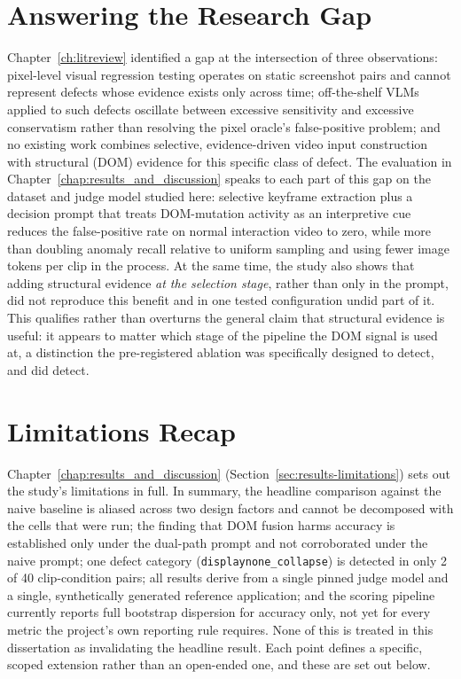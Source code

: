 \section{Answering the Research Gap}
Chapter~\ref{ch:litreview} identified a gap at the intersection of three observations: pixel-level visual regression testing operates on static screenshot pairs and cannot represent defects whose evidence exists only across time; off-the-shelf VLMs applied to such defects oscillate between excessive sensitivity and excessive conservatism rather than resolving the pixel oracle's false-positive problem; and no existing work combines selective, evidence-driven video input construction with structural (DOM) evidence for this specific class of defect. The evaluation in Chapter~\ref{chap:results_and_discussion} speaks to each part of this gap on the dataset and judge model studied here: selective keyframe extraction plus a decision prompt that treats DOM-mutation activity as an interpretive cue reduces the false-positive rate on normal interaction video to zero, while more than doubling anomaly recall relative to uniform sampling and using fewer image tokens per clip in the process. At the same time, the study also shows that adding structural evidence \emph{at the selection stage}, rather than only in the prompt, did not reproduce this benefit and in one tested configuration undid part of it. This qualifies rather than overturns the general claim that structural evidence is useful: it appears to matter which stage of the pipeline the DOM signal is used at, a distinction the pre-registered ablation was specifically designed to detect, and did detect.

\section{Limitations Recap}
Chapter~\ref{chap:results_and_discussion} (Section~\ref{sec:results-limitations}) sets out the study's limitations in full. In summary, the headline comparison against the naive baseline is aliased across two design factors and cannot be decomposed with the cells that were run; the finding that DOM fusion harms accuracy is established only under the dual-path prompt and not corroborated under the naive prompt; one defect category (\texttt{displaynone\_collapse}) is detected in only 2 of 40 clip-condition pairs; all results derive from a single pinned judge model and a single, synthetically generated reference application; and the scoring pipeline currently reports full bootstrap dispersion for accuracy only, not yet for every metric the project's own reporting rule requires. None of this is treated in this dissertation as invalidating the headline result. Each point defines a specific, scoped extension rather than an open-ended one, and these are set out below.

